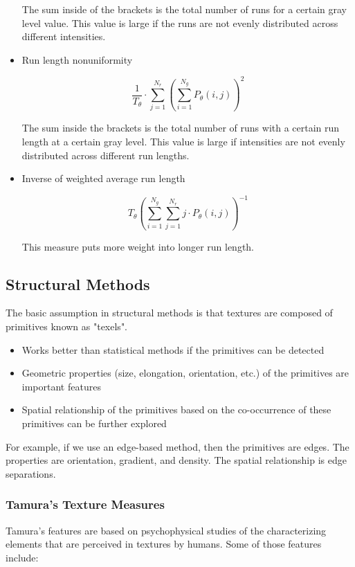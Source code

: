 \documentclass{article}
\begin{document}
\begin{multicols}{3}
\begin{itemize}
The sum inside of the brackets is the total number of runs for a certain gray level value. This value is large if the runs are not evenly distributed across different intensities.

\item Run length nonuniformity
  
$$
\frac{1}{T_\theta} \cdot \sum_{j=1} ^{N_r} \left(\sum_{i=1} ^{N_g} P_\theta (i,j)\right)^2
$$

The sum inside the brackets is the total number of runs with a certain run length at a certain gray level. This value is large if intensities are not evenly distributed across different run lengths.

\item Inverse of weighted average run length
  
$$
T_\theta\left(\sum_{i=1}^{N_g} \sum_{j=1} ^{N_r} j \cdot P_\theta (i,j)\right)^{-1}
$$

This measure puts more weight into longer run length.

\end{itemize}

\subsection{Structural Methods}

The basic assumption in structural methods is that textures are composed of primitives known as "texels".

\begin{itemize}
\itemsep0em
\item {Works better than statistical methods if the primitives can be detected}
\item {Geometric properties (size, elongation, orientation, etc.) of the primitives are important features}
\item {Spatial relationship of the primitives based on the co-occurrence of these primitives can be further explored}
\end{itemize}

For example, if we use an edge-based method, then the primitives are edges. The properties are orientation, gradient, and density. The spatial relationship is edge separations.

\subsubsection{Tamura's Texture Measures}

Tamura's features are based on psychophysical studies of the characterizing elements that are perceived in textures by humans. Some of those features include:


\end{multicols}
\end{document}

